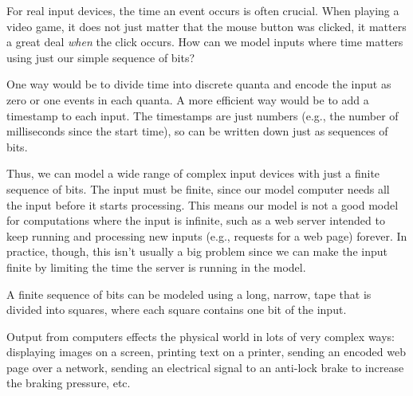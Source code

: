 \begin{schemeregion}
For real input devices, the time an event occurs is often crucial.  When playing a video game, it does not just matter that the mouse button was clicked, it matters a great deal \emph{when} the click occurs.  How can we model inputs where time matters using just our simple sequence of bits?  

One way would be to divide time into discrete quanta and encode the input as zero or one events in each quanta.  A more efficient way would be to add a timestamp to each input.  The timestamps are just numbers (e.g., the number of milliseconds since the start time), so can be written down just as sequences of bits.

Thus, we can model a wide range of complex input devices with just a finite sequence of bits.  The input must be finite, since our model computer needs all the input before it starts processing.  This means our model is not a good model for computations where the input is infinite, such as a web server intended to keep running and processing new inputs (e.g., requests for a web page) forever.  In practice, though, this isn't usually a big problem since we can make the input finite by limiting the time the server is running in the model.

A finite sequence of bits can be modeled using a long, narrow, tape that is divided into squares, where each square contains one bit of the input.

 Output from computers effects the physical world in lots of very complex ways: displaying images on a screen, printing text on a printer, sending an encoded web page over a network, sending an electrical signal to an anti-lock brake to increase the braking pressure, etc.  



\end{schemeregion}
